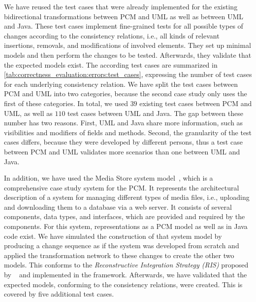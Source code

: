 We have reused the test cases that were already implemented for the existing bidirectional transformations between \gls{PCM} and \gls{UML} as well as between \gls{UML} and Java.
These test cases implement fine-grained tests for all possible types of changes according to the consistency relations, i.e., all kinds of relevant insertions, removals, and modifications of involved elements.
They set up minimal models and then perform the changes to be tested.
Afterwards, they validate that the expected models exist.
The according test cases are summarized in \autoref{tab:correctness_evaluation:errors:test_cases}, expressing the number of test cases for each underlying consistency relation.
We have split the test cases between \gls{PCM} and \gls{UML} into two categories, because the second case study only uses the first of these categories.
In total, we used $39$ existing test cases between \gls{PCM} and \gls{UML}, as well as $110$ test cases between \gls{UML} and Java.
The gap between these number has two reasons. First, \gls{UML} and Java share more information, such as visibilities and modifiers of fields and methods. Second, the granularity of the test cases differs, because they were developed by different persons, thus a test case between \gls{PCM} and \gls{UML} validates more scenarios than one between \gls{UML} and Java.

In addition, we have used the Media Store system model~\cite{strittmatter2016a}, which is a comprehensive case study system for the \gls{PCM}.
It represents the architectural description of a system for managing different types of media files, i.e., uploading and downloading them to a database via a web server.
It consists of several components, data types, and interfaces, which are provided and required by the components.
For this system, representations as a \gls{PCM} model as well as in Java code exist.
We have simulated the construction of that system model by producing a change sequence as if the system was developed from scratch and applied the transformation network to these changes to create the other two models.
This conforms to the \emph{Reconstructive Integration Strategy (RIS)} proposed by \citeauthor{langhammer2017a}~ and implemented in the \vitruv framework.
Afterwards, we have validated that the expected models, conforming to the consistency relations, were created.
This is covered by five additional test cases.

